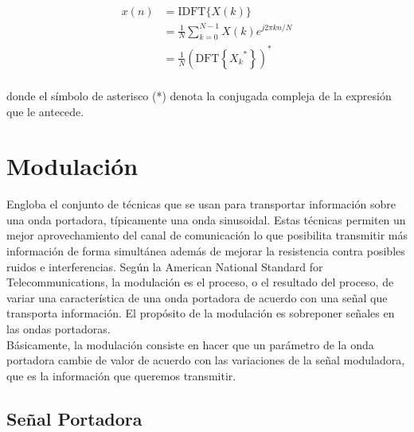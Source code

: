 \documentclass[a4paper]{article}
\begin{document}
\[{\displaystyle {\begin{aligned}x(n)&={\text{IDFT}}\{X(k)\}\\&={\frac {1}{N}}\sum _{k=0}^{N-1}X(k)e^{j2\pi kn/N}\\&={\frac {1}{N}}\left({\text{DFT}}\left\{{X_{k}}^{*}\right\}\right)^{*}\\\end{aligned}}}\]

donde el símbolo de asterisco (*) denota la conjugada compleja de la expresión que le antecede.

\section{Modulaci\'on}

Engloba el conjunto de técnicas que se usan para transportar información sobre una onda portadora, típicamente una onda sinusoidal. Estas técnicas permiten un mejor aprovechamiento del canal de comunicación lo que posibilita transmitir más información de forma simultánea además de mejorar la resistencia contra posibles ruidos e interferencias. Según la American National Standard for Telecommunications, la modulación es el proceso, o el resultado del proceso, de variar una característica de una onda portadora de acuerdo con una señal que transporta información. El propósito de la modulación es sobreponer señales en las ondas portadoras.
\\
Básicamente, la modulación consiste en hacer que un parámetro de la onda portadora cambie de valor de acuerdo con las variaciones de la señal moduladora, que es la información que queremos transmitir.

\subsection{Se\~nal Portadora}
\end{document}
